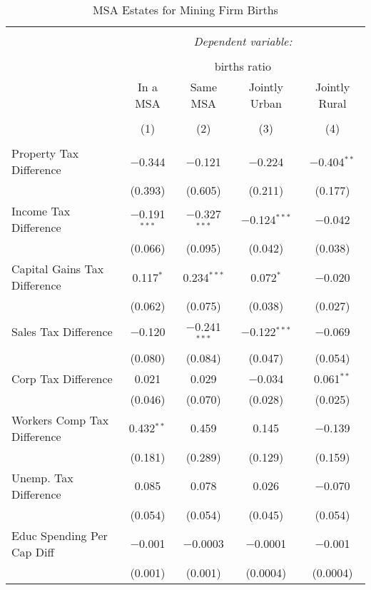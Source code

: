 
\begin{table}[!htbp] \centering 
  \caption{MSA Estates for  Mining Firm Births} 
  \label{} 
\begin{tabular}{@{\extracolsep{5pt}}lcccc} 
\\[-1.8ex]\hline 
\hline \\[-1.8ex] 
 & \multicolumn{4}{c}{\textit{Dependent variable:}} \\ 
\cline{2-5} 
\\[-1.8ex] & \multicolumn{4}{c}{births ratio} \\ 
 & In a MSA & Same MSA & Jointly Urban & Jointly Rural \\ 
\\[-1.8ex] & (1) & (2) & (3) & (4)\\ 
\hline \\[-1.8ex] 
 Property Tax Difference & $-$0.344 & $-$0.121 & $-$0.224 & $-$0.404$^{**}$ \\ 
  & (0.393) & (0.605) & (0.211) & (0.177) \\ 
  Income Tax Difference & $-$0.191$^{***}$ & $-$0.327$^{***}$ & $-$0.124$^{***}$ & $-$0.042 \\ 
  & (0.066) & (0.095) & (0.042) & (0.038) \\ 
  Capital Gains Tax Difference & 0.117$^{*}$ & 0.234$^{***}$ & 0.072$^{*}$ & $-$0.020 \\ 
  & (0.062) & (0.075) & (0.038) & (0.027) \\ 
  Sales Tax Difference & $-$0.120 & $-$0.241$^{***}$ & $-$0.122$^{***}$ & $-$0.069 \\ 
  & (0.080) & (0.084) & (0.047) & (0.054) \\ 
  Corp Tax Difference & 0.021 & 0.029 & $-$0.034 & 0.061$^{**}$ \\ 
  & (0.046) & (0.070) & (0.028) & (0.025) \\ 
  Workers Comp Tax Difference & 0.432$^{**}$ & 0.459 & 0.145 & $-$0.139 \\ 
  & (0.181) & (0.289) & (0.129) & (0.159) \\ 
  Unemp. Tax Difference & 0.085 & 0.078 & 0.026 & $-$0.070 \\ 
  & (0.054) & (0.054) & (0.045) & (0.054) \\ 
  Educ Spending Per Cap Diff & $-$0.001 & $-$0.0003 & $-$0.0001 & $-$0.001 \\ 
  & (0.001) & (0.001) & (0.0004) & (0.0004) \\ 

\end{tabular}
\end{table}
